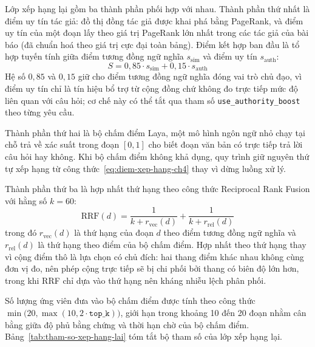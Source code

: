 Lớp xếp hạng lại gồm ba thành phần phối hợp với nhau. Thành phần thứ nhất là điểm uy tín tác giả: đồ thị đồng tác giả được khai phá bằng PageRank, và điểm uy tín của một đoạn lấy theo giá trị PageRank lớn nhất trong các tác giả của bài báo (đã chuẩn hoá theo giá trị cực đại toàn bảng). Điểm kết hợp ban đầu là tổ hợp tuyến tính giữa điểm tương đồng ngữ nghĩa $s_{\text{sim}}$ và điểm uy tín $s_{\text{auth}}$:
\begin{equation}
    S = 0{,}85 \cdot s_{\text{sim}} + 0{,}15 \cdot s_{\text{auth}}
    \label{eq:diem-xep-hang-ch4}
\end{equation}
Hệ số $0{,}85$ và $0{,}15$ giữ cho điểm tương đồng ngữ nghĩa đóng vai trò chủ đạo, vì điểm uy tín chỉ là tín hiệu bổ trợ từ cộng đồng chứ không đo trực tiếp mức độ liên quan với câu hỏi; cơ chế này có thể tắt qua tham số \texttt{use\_authority\_boost} theo từng yêu cầu.

Thành phần thứ hai là bộ chấm điểm Laya, một mô hình ngôn ngữ nhỏ chạy tại chỗ trả về xác suất trong đoạn $[0, 1]$ cho biết đoạn văn bản có trực tiếp trả lời câu hỏi hay không. Khi bộ chấm điểm không khả dụng, quy trình giữ nguyên thứ tự xếp hạng từ công thức~\eqref{eq:diem-xep-hang-ch4} thay vì dừng luồng xử lý.

Thành phần thứ ba là hợp nhất thứ hạng theo công thức Reciprocal Rank Fusion với hằng số $k = 60$:
\begin{equation}
    \text{RRF}(d) = \frac{1}{k + r_{\text{vec}}(d)} + \frac{1}{k + r_{\text{rel}}(d)}
    \label{eq:rrf-ch4}
\end{equation}
trong đó $r_{\text{vec}}(d)$ là thứ hạng của đoạn $d$ theo điểm tương đồng ngữ nghĩa và $r_{\text{rel}}(d)$ là thứ hạng theo điểm của bộ chấm điểm. Hợp nhất theo thứ hạng thay vì cộng điểm thô là lựa chọn có chủ đích: hai thang điểm khác nhau không cùng đơn vị đo, nên phép cộng trực tiếp sẽ bị chi phối bởi thang có biên độ lớn hơn, trong khi RRF chỉ dựa vào thứ hạng nên kháng nhiễu lệch phân phối.

Số lượng ứng viên đưa vào bộ chấm điểm được tính theo công thức $\min\bigl(20, \max(10, 2 \cdot \texttt{top\_k})\bigr)$, giới hạn trong khoảng 10 đến 20 đoạn nhằm cân bằng giữa độ phủ bằng chứng và thời hạn chờ của bộ chấm điểm. Bảng~\ref{tab:tham-so-xep-hang-lai} tóm tắt bộ tham số của lớp xếp hạng lại.

